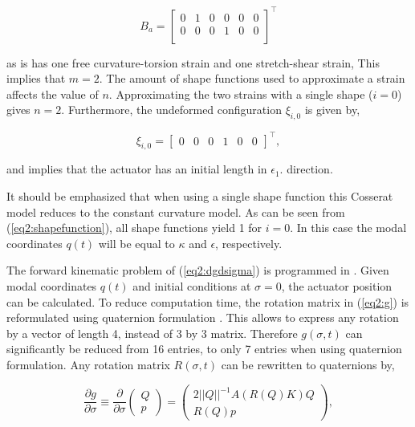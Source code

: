 \begin{equation}
    B_a = \begin{bmatrix}
    0 & 1 & 0 & 0 & 0 & 0 \\
    0 & 0 & 0 & 1 & 0 & 0 \\
    \end{bmatrix}^\top
\end{equation}

as is has one free curvature-torsion strain and one stretch-shear strain, This implies that $m = 2$. The amount of shape functions used to approximate a strain affects the value of $n$. Approximating the two strains with a single shape ($i=0$) gives $n = 2$. Furthermore, the undeformed configuration $\xi_{i,0}$ is given by,

\begin{equation}
    \xi_{i,0} = \begin{bmatrix}  0 & 0 & 0 & 1 & 0 & 0 \end{bmatrix}^\top, 
\end{equation}

and implies that the actuator has an initial length in $\epsilon_1$. direction.

It should be emphasized that when using a single shape function this Cosserat model reduces to the constant curvature model. As can be seen from (\ref{eq2:shapefunction}), all shape functions yield 1 for $i=0$. In this case the modal coordinates $q(t)$ will be equal to $\kappa$ and $\epsilon$, respectively. 

The forward kinematic problem of (\ref{eq2:dgdsigma}) is programmed in \MATLAB \cite{MATLAB2020}. Given modal coordinates $q(t)$ and initial conditions at $\sigma = 0$, the actuator position can be calculated. To reduce computation time, the rotation matrix in (\ref{eq2:g}) is reformulated using quaternion formulation \cite{Boyer2019}. This allows to express any rotation by a vector of length 4, instead of 3 by 3 matrix. Therefore $g(\sigma,t)$ can significantly be reduced from 16 entries, to only 7 entries when using quaternion formulation. Any rotation matrix $R(\sigma,t)$ can be rewritten to quaternions by,


\begin{equation}
\frac{\partial g}{\partial \sigma} \equiv \frac{\partial}{\partial \sigma}    \begin{pmatrix} Q \\ p \end{pmatrix} = \begin{pmatrix} 2 ||Q||^{-1} A(R(Q)K)Q \\ R(Q)p \end{pmatrix},
\label{eq2:Qp}
\end{equation}

